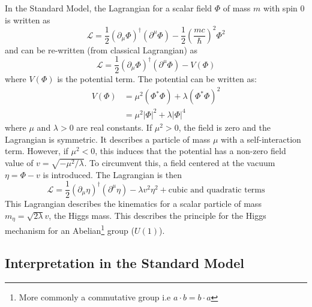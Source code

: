 In the Standard Model, the Lagrangian for a scalar field $\Phi$ of mass $m$ with spin 0 is written as \cite{Griffiths:343277}
\begin{equation}
  \mathcal{L} = \frac{1}{2}(\partial_{\mu}\Phi)^{\dagger}(\partial^{\mu}\Phi) - \frac{1}{2}\left(\frac{mc}{\hbar}\right)^2\Phi^2
\end{equation}
and can be re-written (from classical Lagrangian) as
\begin{equation} \label{eq:HiggsLag}
  \mathcal{L} = \frac{1}{2}(\partial_{\mu}\Phi)^{\dagger}(\partial^{\mu}\Phi) - V(\Phi)
\end{equation}
where $V(\Phi)$ is the potential term. The potential can be written as:
\begin{equation} \label{eq:HiggsPotential}
  \begin{aligned}
    V(\Phi) & = \mu^2(\Phi^*\Phi) + \lambda(\Phi^*\Phi)^2 \\
    & = \mu^2|\Phi|^2 + \lambda|\Phi|^4
  \end{aligned}
\end{equation}
where $\mu$ and $\lambda > 0$ are real constants. If $\mu^2 > 0$, the field is zero and the Lagrangian is symmetric. It describes a particle of mass $\mu$ with a self-interaction term. However, if $\mu^2 < 0$, this induces that the potential has a non-zero field value of $v = \sqrt{-\mu^2/\lambda}$. To circumvent this, a field centered at the vacuum $\eta = \Phi - v$ is introduced. The Lagrangian is then
\begin{equation}
  \mathcal{L} = \frac{1}{2}(\partial_{\mu}\eta)^{\dagger}(\partial^{\mu}\eta) - \lambda v^2\eta^2 + \text{cubic and quadratic terms}
\end{equation}
This Lagrangian describes the kinematics for a scalar particle of mass $m_{\eta} = \sqrt{2\lambda}v$, the Higgs mass. This describes the principle for the Higgs mechanism for an Abelian\footnote{More commonly a commutative group i.e $a \cdot b = b \cdot a$} group ($U(1)$).

\subsection{Interpretation in the Standard Model}
\label{sec:HiggsSM}

